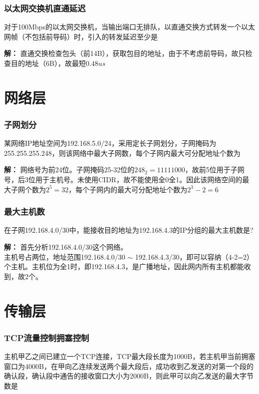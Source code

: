 \subsubsection{以太网交换机直通延迟}
对于100Mbps的以太网交换机，当输出端口无排队，以直通交换方式转发一个以太网帧（不包括前导码）时，引入的转发延迟至少是

\textbf{解：}
直通交换检查包头（前14B），获取包目的地址，由于不考虑前导码，故只检查目的地址（6B），故最短\(0.48us\)


\section{网络层}

\subsubsection{子网划分}
某网络IP地址空间为192.168.5.0/24，采用定长子网划分，子网掩码为255.255.255.248，则该网络中最大子网数，每个子网内最大可分配地址个数为

\textbf{解：}
网络号为前24位。子网掩码25-32位的\(248_2 = 11111000\)，故前5位用于子网号，后3位用于主机号。未使用CIDR，故不能使用全0全1。因此该网络空间的最大子网个数为\(2^5 = 32\)，每个子网内的最大可分配地址个数为\(2^3 - 2 = 6\)


\subsubsection{最大主机数}
在子网192.168.4.0/30中，能接收目的地址为192.168.4.3的IP分组的最大主机数是?

\textbf{解：}
首先分析192.168.4.0/30这个网络。 \\
主机号占两位，地址范围192.168.4.0/30 \(\sim\) 192.168.4.3/30，即可以容纳（4-2=2）个主机。主机位为全1时，即192.168.4.3，是广播地址，因此网内所有主机都能收到，故2个。


\section{传输层}

\subsubsection{TCP流量控制拥塞控制}
主机甲乙之间已建立一个TCP连接，TCP最大段长度为1000B，若主机甲当前拥塞窗口为4000B，在甲向乙连续发送两个最大段后，成功收到乙发送的对第一个段的确认段，确认段中通告的接收窗口大小为2000B，则此甲可以向乙发送的最大字节数是

